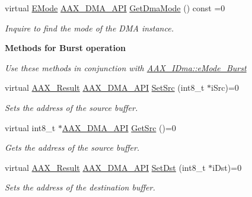 \begin{Indent}
\begin{DoxyCompactItemize}
virtual \mbox{\hyperlink{a01809_af8d0f19f2896dd6dbd126b919b24e39b}{E\+Mode}} \mbox{\hyperlink{a00587_acae60d01e5e4bd3282369d0d9d378f3f}{A\+A\+X\+\_\+\+D\+M\+A\+\_\+\+A\+PI}} \mbox{\hyperlink{a01809_a9bd67775d41c32da19d5532362fe86c8}{Get\+Dma\+Mode}} () const =0
\begin{DoxyCompactList}\small\item\em Inquire to find the mode of the D\+MA instance. \end{DoxyCompactList}\end{DoxyCompactItemize}
\end{Indent}
\begin{Indent}\textbf{ Methods for Burst operation}\par
{\em Use these methods in conjunction with \mbox{\hyperlink{a01809_af8d0f19f2896dd6dbd126b919b24e39ba253c129077dc004dd83cca8931e69eb9}{A\+A\+X\+\_\+\+I\+Dma\+::e\+Mode\+\_\+\+Burst}} }\begin{DoxyCompactItemize}
\item 
virtual \mbox{\hyperlink{a00392_a4d8f69a697df7f70c3a8e9b8ee130d2f}{A\+A\+X\+\_\+\+Result}} \mbox{\hyperlink{a00587_acae60d01e5e4bd3282369d0d9d378f3f}{A\+A\+X\+\_\+\+D\+M\+A\+\_\+\+A\+PI}} \mbox{\hyperlink{a01809_a92774eab2dec8864d617e2655f3de00d}{Set\+Src}} (int8\+\_\+t $\ast$i\+Src)=0
\begin{DoxyCompactList}\small\item\em Sets the address of the source buffer. \end{DoxyCompactList}\item 
virtual int8\+\_\+t $\ast$\mbox{\hyperlink{a00587_acae60d01e5e4bd3282369d0d9d378f3f}{A\+A\+X\+\_\+\+D\+M\+A\+\_\+\+A\+PI}} \mbox{\hyperlink{a01809_af3adfd15058b274b01b86705d42a4cd6}{Get\+Src}} ()=0
\begin{DoxyCompactList}\small\item\em Gets the address of the source buffer. \end{DoxyCompactList}\item 
virtual \mbox{\hyperlink{a00392_a4d8f69a697df7f70c3a8e9b8ee130d2f}{A\+A\+X\+\_\+\+Result}} \mbox{\hyperlink{a00587_acae60d01e5e4bd3282369d0d9d378f3f}{A\+A\+X\+\_\+\+D\+M\+A\+\_\+\+A\+PI}} \mbox{\hyperlink{a01809_a80c98a61fc14c8cc87a30360e92655fe}{Set\+Dst}} (int8\+\_\+t $\ast$i\+Dst)=0
\begin{DoxyCompactList}\small\item\em Sets the address of the destination buffer. \end{DoxyCompactList}\item 

\end{DoxyCompactItemize}
\end{Indent}
